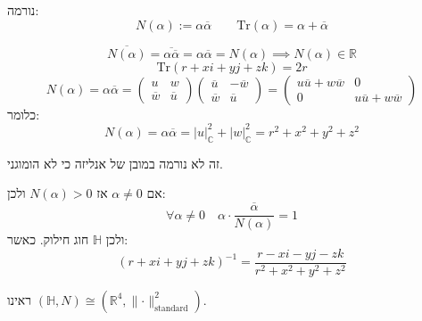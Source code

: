 \documentclass{tstextbook}
\begin{document}
\begin{definition}
נורמה:
$$N(\alpha):= \alpha \overline{\alpha}\qquad \mathrm{Tr}(\alpha)=\alpha+\overline{\alpha}  $$

\end{definition}
\begin{proposition}
$$\overline{N(\alpha)} =\overline{\alpha \overline{\alpha} } =\alpha \overline{\alpha} =N(\alpha)\implies N(\alpha)\in \mathbb{R}$$$$\mathrm{Tr}(r+x i + y j + zk)=2r$$$$N(\alpha)=\alpha \overline{\alpha} =\begin{pmatrix}u & w \\ \overline{w}  & \overline{u}  \end{pmatrix}\begin{pmatrix}\overline{u}  & -\overline{w}  \\\overline{w}  & \overline{u} \end{pmatrix}=\begin{pmatrix}u\overline{u} +w\overline{w} & 0  \\0 & u\overline{u}   +w\overline{w}  
\end{pmatrix}$$
כלומר:
$$N(\alpha)=\alpha \overline{\alpha} =\lvert u \rvert_{\mathbb{C}} ^{2}+\lvert w \rvert _{\mathbb{C}}^{2}=r^{2}+x^{2}+y^{2}+z^{2}$$

\end{proposition}
\begin{remark}
זה לא נורמה במובן של אנליזה כי לא הומוגני.

\end{remark}
\begin{corollary}
אם \(\alpha \neq 0\) אז \(N(\alpha)> 0\) ולכן:
$$\forall \alpha \neq 0\quad \alpha \cdot \frac{\overline{\alpha}}{N(\alpha)}=1 $$
ולכן \(\mathbb{H}\) חוג חילוק. כאשר:
$$(r+x i +yj + zk)^{-1}= \frac{r - x i - yj - zk}{r^{2}+x^{2}+y^{2}+z^{2}}$$

\end{corollary}
ראינו \((\mathbb{H},N)\cong(\mathbb{R}^{4},\lVert \cdot \rVert^{2}_{\text{standard}})\). 
\end{document}
